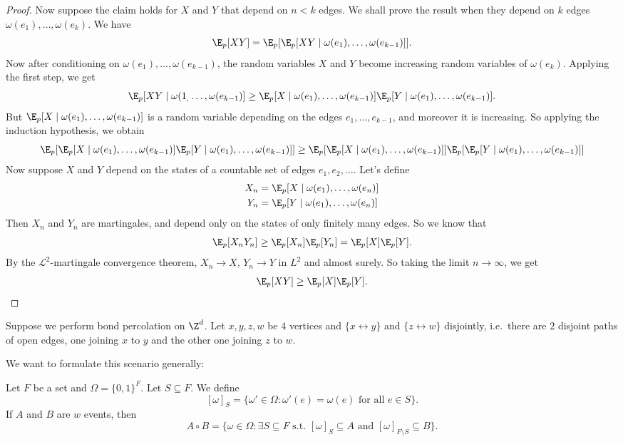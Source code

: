 \documentclass[a4paper]{article}
\begin{document}
\begin{proof}
  Now suppose the claim holds for $X$ and $Y$ that depend on $n < k$ edges. We shall prove the result when they depend on $k$ edges $\omega(e_1), \ldots, \omega(e_k)$. We have
  \[
    \E_p[XY] = \E_p[\E_p[XY \mid \omega(e_1), \ldots, \omega(e_{k - 1})]].
  \]
  Now after conditioning on $\omega(e_1), \ldots, \omega(e_{k - 1})$, the random variables $X$ and $Y$ become increasing random variables of $\omega(e_k)$. Applying the first step, we get
  \[
    \E_p[X Y \mid \omega(1_, \ldots, \omega(e_{k - 1})] \geq \E_p[X \mid \omega(e_1), \ldots, \omega(e_{k - 1})] \E_p[Y \mid \omega(e_1), \ldots, \omega(e_{k - 1})].
  \]
  But $\E_p[X \mid \omega(e_1), \ldots, \omega(e_{k - 1})]$ is a random variable depending on the edges $e_1, \ldots, e_{k - 1}$, and moreover it is increasing. So applying the induction hypothesis, we obtain
  \[
    \E_p[\E_p[X \mid \omega(e_1), \ldots, \omega(e_{k - 1})] \E_p[Y \mid \omega(e_1), \ldots, \omega(e_{k - 1})]] \geq \E_p[\E_p[X \mid \omega(e_1), \ldots, \omega(e_{k - 1})]] \E_p[\E_p[Y \mid \omega(e_1), \ldots, \omega(e_{k - 1})]]
  \]
  Now suppose $X$ and $Y$ depend on the states of a countable set of edges $e_1, e_2, \ldots$. Let's define
  \begin{align*}
    X_n &= \E_p [X \mid \omega(e_1), \ldots, \omega(e_n)]\\
    Y_n &= \E_p [Y \mid \omega(e_1), \ldots, \omega(e_n)]
  \end{align*}
  Then $X_n$ and $Y_n$ are martingales, and depend only on the states of only finitely many edges. So we know that
  \[
    \E_p[X_n Y_n] \geq \E_p [X_n] \E_p[Y_n] = \E_p[X] \E_p[Y].
  \]
  By the $\mathcal{L}^2$-martingale convergence theorem, $X_n \to X$, $Y_n \to Y$ in $L^2$ and almost surely. So taking the limit $n \to \infty$, we get
  \[
    \E_p[XY] \geq \E_p[X] \E_p[Y].
  \]
\end{proof}

\begin{eg}
  Suppose we perform bond percolation on $\Z^d$. Let $x, y, z, w$ be $4$ vertices and $\{x \leftrightarrow y\}$ and $\{z \leftrightarrow w\}$ disjointly, i.e.\ there are $2$ disjoint paths of open edges, one joining $x$ to $y$ and the other one joining $z$ to $w$.
\end{eg}

We want to formulate this scenario generally:
\begin{defi}
  Let $F$ be a set and $\Omega = \{0, 1\}^F$. Let $S \subseteq F$. We define
  \[
    [\omega]_S = \{\omega' \in \Omega: \omega'(e) = \omega(e)\text{ for all }e \in S\}.
  \]
  If $A$ and $B$ are $w$ events, then
  \[
    A \circ B = \{\omega \in \Omega : \exists S \subseteq F\text{ s.t. } [\omega]_S \subseteq A \text{ and } [\omega]_{F\setminus S} \subseteq B\}.
  \]
\end{defi}
\end{document}
